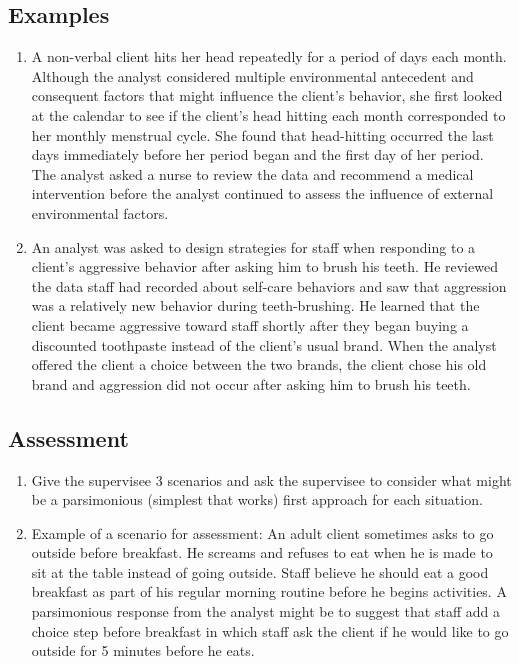 \subsection{Examples}
\begin{enumerate}
\item A non-verbal client hits her head repeatedly for a period of days each month. Although the analyst considered multiple environmental antecedent and consequent factors that might influence the client's behavior, she first looked at the calendar to see if the client's head hitting each month corresponded to her monthly menstrual cycle. She found that head-hitting occurred the last days immediately before her period began and the first day of her period. The analyst asked a nurse to review the data and recommend a medical intervention before the analyst continued to assess the influence of external environmental factors. 
\item An analyst was asked to design strategies for staff when responding to a client's aggressive behavior after asking him to brush his teeth. He reviewed the data staff had recorded about self-care behaviors and saw that aggression was a relatively new behavior during teeth-brushing. He learned that the client became aggressive toward staff shortly after they began buying a discounted toothpaste instead of the client's usual brand. When the analyst offered the client a choice between the two brands, the client chose his old brand and aggression did not occur after asking him to brush his teeth.
\end{enumerate}
%
\subsection{Assessment}
\begin{enumerate}
\item Give the supervisee 3 scenarios and ask the supervisee to consider what might be a parsimonious (simplest that works) first approach for each situation.
\item Example of a scenario for assessment: An adult client sometimes asks to go outside before breakfast. He screams and refuses to eat when he is made to sit at the table instead of going outside. Staff believe he should eat a good breakfast as part of his regular morning routine before he begins activities. A parsimonious response from the analyst might be to suggest that staff add a choice step before breakfast in which staff ask the client if he would like to go outside for 5 minutes before he eats. 
%
\end{enumerate}
%
